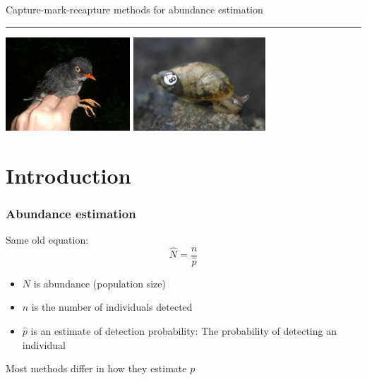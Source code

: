 \documentclass[color=usenames,dvipsnames]{beamer}\usepackage[]{graphicx}\usepackage[]{color}
\begin{document}

\begin{frame}[plain]
  \begin{center}
    {\huge Capture-mark-recapture methods for abundance estimation \par}
    \vspace{0.5cm}
    {\color{RoyalBlue} \rule{\textwidth}{0.1pt}}
    \vfill
    \includegraphics[height=3.5cm,keepaspectratio]{figs/SBNT} %
    \hspace{0.5cm}
      \includegraphics[height=3.5cm,keepaspectratio]{figs/Novisuccinea_chittenangoensis_4}
  \end{center}
\end{frame}




\section{Introduction}


\begin{frame}
  \frametitle{Abundance estimation}
  \large
  Same old equation:
  \[
    \hat{N} = \frac{n}{\hat{p}}
  \]
  \begin{itemize}
    \item $N$ is abundance (population size)
    \item $n$ is the number of individuals detected
    \item $\hat{p}$ is an estimate of detection probability: The probability
      of detecting an individual
  \end{itemize}
  \pause
  \vfill
  \centering
  \Large %
  Most methods differ in how they estimate $p$ \\
\end{frame}
\end{document}
